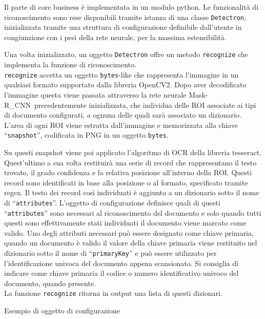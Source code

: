 \documentclass[12pt,a4paper]{article}
\newcommand{\mrcnn}{Mask-R\_CNN}
\begin{document}
Il parte di core business è implementata in un modulo python. Le
funzionalità di riconoscimento sono rese disponibili tramite istanza di
una classe \texttt{Detectron}, inizializzata tramite una struttura di
configurazione definibile dall'utente in congiunzione con i pesi della
rete neurale, per la massima estensibilità.

Una volta inizializzato, un oggetto \texttt{Detectron} offre un metodo
\texttt{recognize} che implementa la funzione di riconoscimento.\\
\texttt{recognize} accetta un oggetto \texttt{bytes}-like che
rappresenta l'immagine in un qualsiasi formato supportato dalla libreria
OpenCV2. Dopo aver decodificato l'immagine questa viene passata
attraverso la rete neurale \mrcnn\ precedentemente inizializzata, che
individua delle ROI associate ai tipi di documento configurati, a ognuna
delle quali sarà associato un dizionario. L'area di ogni ROI viene
estratta dall'immagine e memorizzata alla chiave ``\texttt{snapshot}'',
codificata in PNG in un oggetto \texttt{bytes}.

Su questi snapshot viene poi applicato l'algoritmo di OCR della libreria
tesseract. Quest'ultimo a sua volta restituirà una serie di record che
rappresentano il testo trovato, il grado confidenza e la relativa
posizione all'interno della ROI. Questi record sono identificati in base
alla posizione o al formato, specificato tramite regex. Il testo dei
record così individuati è aggiunto a un dizionario sotto il nome di
``\texttt{attributes}''. L'oggetto di configurazione definisce quali di
questi ``\texttt{attributes}'' sono necessari al riconoscimento del
documento e solo quando tutti questi sono effettivamente stati
individuati il documento viene marcato come valido. Uno degli attributi
necessari può essere designato come chiave primaria, quando un documento
è valido il valore della chiave primaria viene restituito nel dizionario
sotto il nome di ``\texttt{primaryKey}'' e può essere utilizzato per
l'identificazione univoca del documento appena scansionato. Si consiglia
di indicare come chiave primaria il codice o numero identificativo
univoco del documento, quando presente.\\
La funzione \texttt{recognize} ritorna in output una lista di questi
dizionari.

\begin{listing}[H]
    \caption{Esempio di oggetto di configurazione}
    \inputminted{python}{config.py}
\end{listing}
\end{document}
